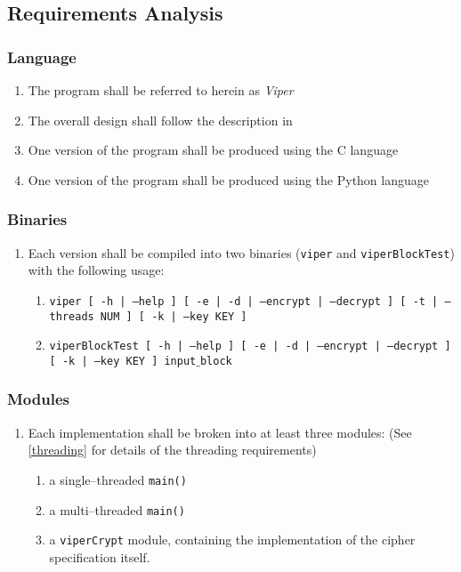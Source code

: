 \subsection{Requirements Analysis}

\subsubsection{Language}
\begin{enumerate}
\item The program shall be referred to herein as \emph{Viper}
\item The overall design shall follow the description in \cite{submission}
\item One version of the program shall be produced using the C language
\item One version of the program shall be produced using the Python language
\end{enumerate}

\subsubsection{Binaries}
\begin{enumerate}
\item Each version shall be compiled into two binaries (\texttt{viper} and \texttt{viperBlockTest}) with the following usage:
	\begin{enumerate}
	\item \texttt{viper [ -h | --help ]  [ -e | -d | --encrypt | --decrypt ] [ -t | --threads NUM ] [ -k | --key KEY ]}
	\item \texttt{viperBlockTest [ -h | --help ]  [ -e | -d | --encrypt | --decrypt ] [ -k | --key KEY ] input$\_$block}
	\end{enumerate}
\end{enumerate}

\subsubsection{Modules}
\begin{enumerate}
\item Each implementation shall be broken into at least three modules: (See \ref{threading} for details of the threading requirements)
	\begin{enumerate}
	\item a single--threaded \texttt{main()}
	\item a multi--threaded \texttt{main()}
	\item a \texttt{viperCrypt} module, containing the implementation of the cipher specification itself.
	\end{enumerate}
\end{enumerate}

